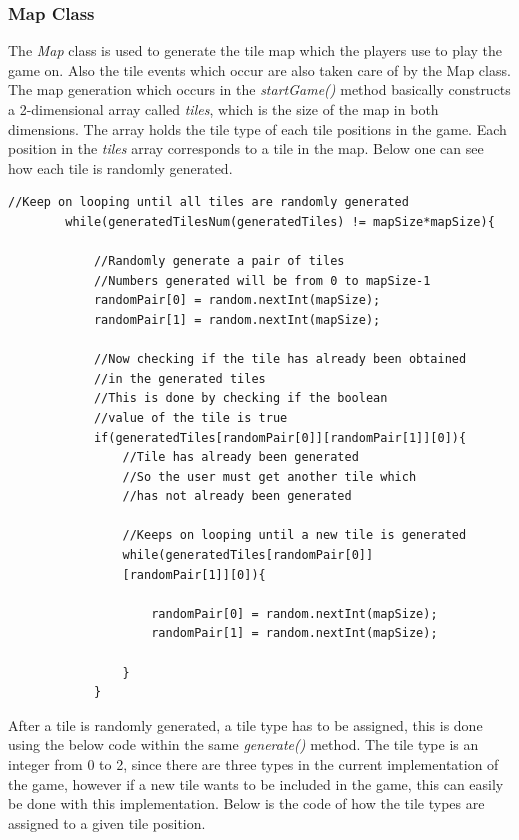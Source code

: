 \documentclass[a4paper,12pt]{extarticle}
\begin{document}
\subsubsection{Map Class}
\noindent The \textit{Map} class is used to generate the tile map which the players use to play the game on. Also the tile events which occur are also taken care of by the Map class.\\

\noindent The map generation which occurs in the \textit{startGame()} method basically constructs a 2-dimensional array called \textit{tiles}, which is the size of the map in both dimensions. The array holds the tile type of each tile positions in the game. Each position in the \textit{tiles} array corresponds to a tile in the map. Below one can see how each tile is randomly generated.

\begin{lstlisting}
//Keep on looping until all tiles are randomly generated
        while(generatedTilesNum(generatedTiles) != mapSize*mapSize){

            //Randomly generate a pair of tiles
            //Numbers generated will be from 0 to mapSize-1
            randomPair[0] = random.nextInt(mapSize);
            randomPair[1] = random.nextInt(mapSize);

            //Now checking if the tile has already been obtained 
            //in the generated tiles
            //This is done by checking if the boolean 
            //value of the tile is true
            if(generatedTiles[randomPair[0]][randomPair[1]][0]){
                //Tile has already been generated
                //So the user must get another tile which
                //has not already been generated

                //Keeps on looping until a new tile is generated
                while(generatedTiles[randomPair[0]]
                [randomPair[1]][0]){

                    randomPair[0] = random.nextInt(mapSize);
                    randomPair[1] = random.nextInt(mapSize);

                }
            }
\end{lstlisting}
\vspace{4mm}

\noindent After a tile is randomly generated, a tile type has to be assigned, this is done using the below code within the same \textit{generate()} method. The tile type is an integer from 0 to 2, since there are three types in the current implementation of the game, however if a new tile wants to be included in the game, this can easily be done with this implementation. Below is the code of how the tile types are assigned to a given tile position.
\end{document}
